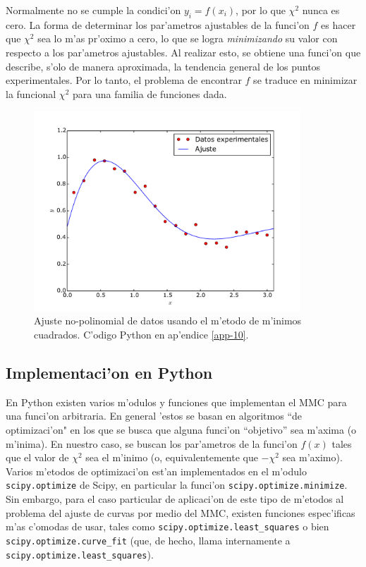 \documentclass[letterpaper,11pt]{report}
\begin{document}
Normalmente no se cumple la condici'on $y_i = f(x_i)$, por lo que $\chi^2$ nunca es cero. La forma de determinar los par'ametros ajustables de la funci'on $f$ es hacer que $\chi^2$ sea lo m'as pr'oximo a cero, lo que se logra \textit{minimizando} su valor con respecto a los par'ametros ajustables. Al realizar esto, se obtiene una funci'on que describe, s'olo de manera aproximada, la tendencia general de los puntos experimentales.
Por lo tanto, el problema de encontrar $f$ se traduce en minimizar la funcional $\chi^2$ para una familia de funciones dada. 
\begin{figure}[h!]
\begin{center}
\includegraphics[width=10cm]{figs/fig-mmc-2.pdf}
\caption{Ajuste no-polinomial de datos usando el m'etodo de m'inimos cuadrados. C'odigo Python en ap'endice \ref{app-10}.}
\end{center}
\label{fig-mmc-2}
\end{figure}
\subsection{Implementaci'on en Python}
En Python existen varios m'odulos y funciones que implementan el MMC para una funci'on arbitraria. En general 'estos se basan en algoritmos ``de optimizaci'on" en los que se busca que alguna funci'on ``objetivo'' sea m'axima (o m'inima). En nuestro caso, se buscan los par'ametros de la funci'on $f(x)$ tales que el valor de $\chi^2$ sea el m'inimo (o, equivalentemente que $-\chi^2$ sea m'aximo). Varios m'etodos de optimizaci'on est'an implementados en el m'odulo \texttt{scipy.optimize} de Scipy, en particular la funci'on \texttt{scipy.optimize.minimize}. Sin embargo, para el caso particular de aplicaci'on de este tipo de m'etodos al problema del ajuste de curvas por medio del MMC, existen funciones espec'ificas m'as c'omodas de usar, tales como \texttt{scipy.optimize.least\_squares} o bien \texttt{scipy.optimize.curve\_fit} (que, de hecho, llama internamente a \texttt{scipy.optimize.least\_squares}).
\end{document}
